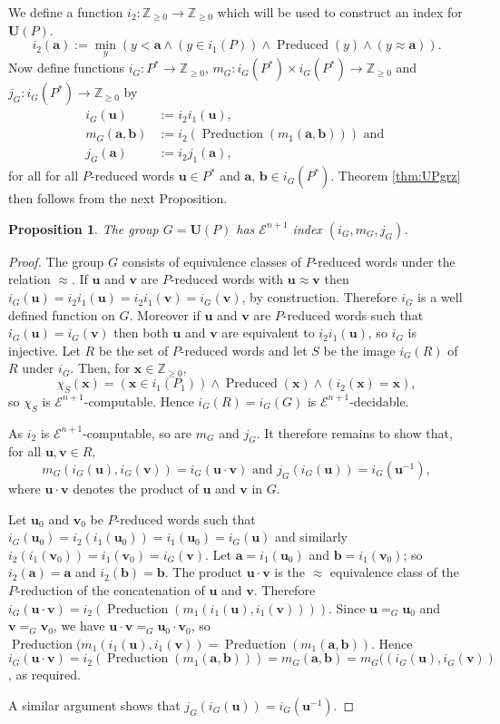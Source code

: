 \documentclass[a4paper]{article}
\newcommand{\grz}[1]{$\mathcal{E}^{#1}$}	%
\newcommand{\ZZ}{\mathbb{Z}}
\newcommand{\maps}{\longrightarrow}
\newcommand{\avec}{\mathbf{a}}	%
\newcommand{\bvec}{\mathbf{b}}	%
\newcommand{\uvec}{\mathbf{u}}	%
\newcommand{\vvec}{\mathbf{v}}	%
\newcommand{\xvec}{\mathbf{x}}	%
\newcommand{\Uvec}{\mathbf{U}}	%
\newcommand{\UP}{\Uvec(P)}
\newcommand{\Preduced}{\operatorname{Preduced}}
\newcommand{\Preduction}{\operatorname{Preduction}}
\theoremstyle{plain}
\newtheorem{proposition}[theorem]{Proposition}
\theoremstyle{definition}
\begin{document}
We define a function $i_2:\ZZ_{\geq 0}\maps \ZZ_{\geq 0}$ which will be used to construct an
index for $\UP$. 
\begin{equation}\label{eq:i2}
i_2(\avec):=\min_y(y<\avec \wedge (y\in i_1(P)) \wedge \Preduced(y) \wedge (y\approx \avec)).
\end{equation}
Now define functions $i_G:P^*\maps \ZZ_{\geq 0}$, 
$m_G:i_G(P^*)\times i_G(P^*) \maps \ZZ_{\geq 0}$
and $j_G:i_G(P^*)\maps \ZZ_{\geq 0}$ by 
\begin{align}
i_G(\uvec) &:=i_2i_1(\uvec),\\
m_G(\avec, \bvec)& :=i_2(\Preduction(m_1(\avec,\bvec))) \textrm{ and }\\
j_G(\avec)&:= i_2j_1(\avec),
\end{align}
for all for all $P$-reduced words $\uvec\in P^*$ and $\avec$, $\bvec \in i_G(P^*)$. 
Theorem \ref{thm:UPgrz} then follows from the next Proposition. 
\begin{proposition}
The group $G=\UP$ has \grz{n+1} index $(i_G,m_G,j_G)$. 
\end{proposition}

\begin{proof}
The group $G$ consists of equivalence classes of $P$-reduced words under the  relation $\approx$.
If $\uvec$ and $\vvec$ are $P$-reduced words with $\uvec\approx \vvec$ then 
$i_G(\uvec)=i_2i_1(\uvec)=i_2i_1(\vvec)=i_G(\vvec)$, by construction. Therefore $i_G$ is 
a well defined function on $G$.  Moreover if  $\uvec$ and $\vvec$ are $P$-reduced words
such that $i_G(\uvec)=i_G(\vvec)$ then both $\uvec$ and 
$\vvec$ are equivalent to $i_2i_1(\uvec)$, so $i_G$ is injective. Let $R$ be the set of 
$P$-reduced words and let $S$ be the image $i_G(R)$ of $R$ under $i_G$. Then, for $\xvec\in \ZZ_{\geq 0}$, 
\[\chi_S(\xvec)=(\xvec\in i_1(P_1)) \wedge \Preduced(\xvec) \wedge (i_2(\xvec)=\xvec),\]
so $\chi_S$ is \grz{n+1}-computable. Hence $i_G(R)=i_G(G)$ is \grz{n+1}-decidable. 

As $i_2$ is \grz{n+1}-computable, so are $m_G$ and $j_G$. It therefore remains to
show that, for all $\uvec,\vvec \in R$, 
\[m_G(i_G(\uvec),i_G(\vvec))=i_G(\uvec\cdot \vvec)\textrm{ and } j_G(i_G(\uvec))=i_G(\uvec^{-1}),\]
where $\uvec\cdot \vvec$ denotes the product of $\uvec$ and $\vvec$ in $G$. 

Let $\uvec_0$ and $\vvec_0$ be $P$-reduced words such that $i_G(\uvec_0)=i_2(i_1(\uvec_0))=i_1(\uvec_0)=
i_G(\uvec)$ and similarly $i_2(i_1(\vvec_0))=i_1(\vvec_0)=
i_G(\vvec)$. Let $\avec=i_1(\uvec_0)$ and $\bvec=i_1(\vvec_0)$; so $i_2(\avec)=\avec$ and 
$i_2(\bvec)=\bvec$.  
The product  $\uvec\cdot \vvec$ is the $\approx$ equivalence class of the
$P$-reduction of the concatenation of $\uvec$ and $\vvec$. Therefore 
$i_G(\uvec\cdot \vvec)=i_2(\Preduction(m_1(i_1(\uvec),i_1(\vvec))))$.  
Since $\uvec=_G \uvec_0$ and $\vvec=_G \vvec_0$, we have $\uvec\cdot \vvec=_G \uvec_0\cdot \vvec_0$, 
so  $\Preduction(m_1(i_1(\uvec),i_1(\vvec))= \Preduction(m_1(\avec,\bvec)).$ Hence 
$i_G(\uvec\cdot \vvec)=i_2(\Preduction(m_1(\avec,\bvec)))=m_G(\avec,\bvec)=m_G((i_G(\uvec),i_G(\vvec))$,
 as required.

A similar argument shows that $j_G(i_G(\uvec))=i_G(\uvec^{-1})$.
\end{proof}
\end{document}
